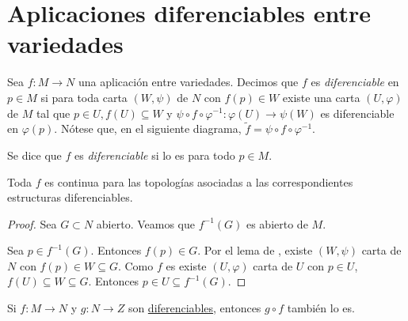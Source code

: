 \documentclass[../VD.tex]{subfiles}
\begin{document}
\setcounter{chapter}{1}
\chapter{Aplicaciones diferenciables entre variedades}
\label{chap:app}

\begin{definition}[diferenciable]
  \label{def:diferenciable}
  Sea \(f \colon M \to N\) una aplicación entre variedades. Decimos que \(f\) es
  \emph{diferenciable} en \(p \in M\) si para toda carta \((W,\psi)\) de \(N\) con \(f(p)
  \in W\) existe una carta \((U,\varphi)\) de \(M\) tal que \(p \in U, f(U)
  \subseteq W\) y \(\psi \circ f \circ \varphi^{-1} \colon \varphi(U) \to
  \psi(W)\) es diferenciable en \(\varphi(p)\). Nótese que, en el siguiente
  diagrama, \(\widetilde{f} = \psi \circ f \circ \varphi^{-1}\).

  Se dice que \(f\) es \emph{diferenciable} si lo es para todo \(p \in M\).

  \begin{figure}[h]
    \centering
  \end{figure}
\end{definition}

\begin{lemma}
  Toda \(f\)  es continua para las topologías
  asociadas a las correspondientes estructuras diferenciables.
\end{lemma}

\begin{proof}
  Sea \(G \subset N\) abierto. Veamos que \(f^{-1}(G)\) es abierto de \(M\).

  Sea \(p \in f^{-1}(G)\). Entonces \(f(p) \in G\). Por el
  lema de , existe
  \((W,\psi)\) carta de \(N\) con \(f(p) \in W \subseteq G\). Como \(f\) es
   existe \((U,\varphi)\) carta de \(U\) con \(p \in
  U\), \(f(U) \subseteq W \subseteq G\). Entonces \(p \in U \subseteq
  f^{-1}(G)\). 
\end{proof}

\begin{lemma}
  Si \(f \colon M \to N\) y \(g \colon N \to Z\) son
  \hyperref[def:diferenciable]{diferenciables}, entonces \(g \circ f\) también
  lo es.
\end{lemma}
\end{document}
